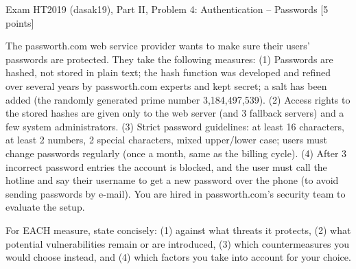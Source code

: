 \documentclass[12pt, a4paper]{article}
\begin{document}
\begin{practicebox}{Exam HT2019 (dasak19), Part II, Problem 4: Authentication -- Passwords [5 points]}
\begin{problembox}
The passworth.com web service provider wants to make sure their users' passwords are protected. They take the following measures: (1) Passwords are hashed, not stored in plain text; the hash function was developed and refined over several years by passworth.com experts and kept secret; a salt has been added (the randomly generated prime number 3,184,497,539). (2) Access rights to the stored hashes are given only to the web server (and 3 fallback servers) and a few system administrators. (3) Strict password guidelines: at least 16 characters, at least 2 numbers, 2 special characters, mixed upper/lower case; users must change passwords regularly (once a month, same as the billing cycle). (4) After 3 incorrect password entries the account is blocked, and the user must call the hotline and say their username to get a new password over the phone (to avoid sending passwords by e-mail). You are hired in passworth.com's security team to evaluate the setup.

For EACH measure, state concisely: (1) against what threats it protects, (2) what potential vulnerabilities remain or are introduced, (3) which countermeasures you would choose instead, and (4) which factors you take into account for your choice.
\end{problembox}


\end{practicebox}
\end{document}
